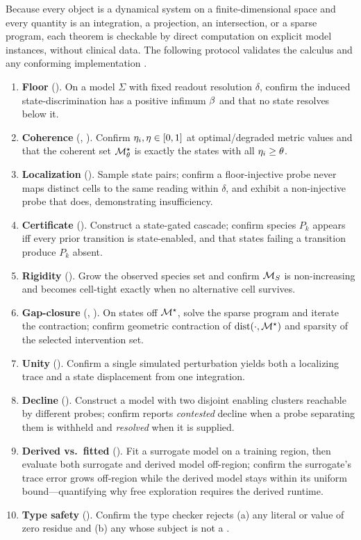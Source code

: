 Because every object is a dynamical system on a finite-dimensional space and
every quantity is an integration, a projection, an intersection, or a sparse
program, each theorem is checkable by direct computation on explicit model
instances, without clinical data. The following protocol validates the calculus
and any conforming implementation \citep{sandve2013ten,wilkinson2016fair}.

\begin{enumerate}[leftmargin=1.6em,itemsep=3pt]
\item \textbf{Floor} (). On a model $\Sigma$ with fixed readout
resolution $\delta$, confirm the induced state-discrimination has a positive
infimum $\beta$ and that no state resolves below it.
\item \textbf{Coherence} (, ).
Confirm $\eta_i,\eta\in[0,1]$ at optimal/degraded metric values and that the
coherent set $\mathcal{M}^{\star}_\theta$ is exactly the states with all
$\eta_i\ge\theta$.
\item \textbf{Localization} (). Sample state pairs;
confirm a floor-injective probe never maps distinct cells to the same reading
within $\delta$, and exhibit a non-injective probe that does, demonstrating
insufficiency.
\item \textbf{Certificate} (). Construct a state-gated
cascade; confirm species $P_k$ appears iff every prior transition is
state-enabled, and that states failing a transition produce $P_k$ absent.
\item \textbf{Rigidity} (). Grow the observed species set and
confirm $\mathcal{M}_S$ is non-increasing and becomes cell-tight exactly when no
alternative cell survives.
\item \textbf{Gap-closure} (, ). On
states off $\mathcal{M}^{\star}$, solve the sparse program and iterate the contraction; confirm
geometric contraction of $\operatorname{dist}(\cdot,\mathcal{M}^{\star})$ and sparsity of the selected
intervention set.
\item \textbf{Unity} (). Confirm a single simulated perturbation
yields both a localizing trace and a state displacement from one integration.
\item \textbf{Decline} (). Construct a model with two disjoint
enabling clusters reachable by different probes; confirm  reports
\emph{contested} decline when a probe separating them is withheld and
\emph{resolved} when it is supplied.
\item \textbf{Derived vs.\ fitted} (). Fit a surrogate model on
a training region, then evaluate both surrogate and derived model off-region;
confirm the surrogate's trace error grows off-region while the derived model
stays within its uniform bound---quantifying why free exploration requires the
derived runtime.
\item \textbf{Type safety} ().
Confirm the type checker rejects (a) any literal or value of zero residue and
(b) any  whose subject is not a .
\end{enumerate}

